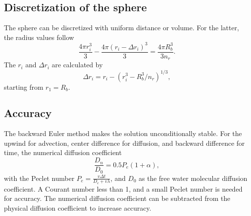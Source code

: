 \documentclass{article}
\begin{document}
\subsection{Discretization of the sphere}
The sphere can be discretized with uniform distance or volume. For the latter, the radius values follow
\begin{equation}
\frac{4\pi r_i^3}{3} - \frac{4\pi (r_i-\Delta r_i)^3}{3} = \frac{4\pi R_b^3}{3n_r}.
\end{equation}
The $r_i$ and $\Delta r_i$ are calculated by
\begin{equation}
\Delta r_i = r_i - (r_i^3 - R_b^3/n_r)^{1/3},
\end{equation}
starting from $r_1 = R_b$.

\subsection{Accuracy}
The backward Euler method makes the solution unconditionally stable.
For the upwind for advection, center difference for diffusion, and backward difference for time, the numerical diffusion coefficient
\begin{equation}
\frac{D_n}{D_0} = 0.5 P_e (1 + \alpha),
\end{equation}
with the Peclet number $P_e=\frac{v \Delta t}{D_e+v\lambda}$, and $D_0$ as the free water molecular diffusion coefficient. A Courant number less than 1, and a small Peclet number is needed for accuracy. The numerical diffusion coefficient can be subtracted from the physical diffusion coefficient to increase accuracy.

{}

\end{document}
